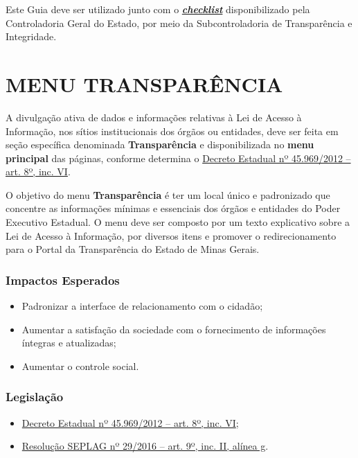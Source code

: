 \documentclass[]{book}
\providecommand{\tightlist}{%
  \setlength{\itemsep}{0pt}\setlength{\parskip}{0pt}}
\begin{document}
Este Guia deve ser utilizado junto com o \textbf{\emph{\href{https://forms.gle/x6rd1aGHzknH8y5m8}{checklist}}} disponibilizado pela Controladoria Geral do Estado, por meio da Subcontroladoria de Transparência e Integridade.

\hypertarget{menu-transparuxeancia}{%
\chapter{MENU TRANSPARÊNCIA}\label{menu-transparuxeancia}}

A divulgação ativa de dados e informações relativas à Lei de Acesso à Informação, nos sítios institucionais dos órgãos ou entidades, deve ser feita em seção específica denominada \textbf{Transparência} e disponibilizada no \textbf{menu principal} das páginas, conforme determina o \href{https://www.almg.gov.br/consulte/legislacao/completa/completa.html?tipo=DEC\&num=45969\&ano=2012}{Decreto Estadual nº 45.969/2012 -- art. 8º, inc. VI}.

O objetivo do menu \textbf{Transparência} é ter um local único e padronizado que concentre as informações mínimas e essenciais dos órgãos e entidades do Poder Executivo Estadual. O menu deve ser composto por um texto explicativo sobre a Lei de Acesso à Informação, por diversos itens e promover o redirecionamento para o Portal da Transparência do Estado de Minas Gerais.

\hypertarget{impactos-esperados}{%
\subsection{Impactos Esperados}\label{impactos-esperados}}

\begin{itemize}
\tightlist
\item
  Padronizar a interface de relacionamento com o cidadão;
\item
  Aumentar a satisfação da sociedade com o fornecimento de informações íntegras e atualizadas;
\item
  Aumentar o controle social.
\end{itemize}

\hypertarget{legislauxe7uxe3o}{%
\subsection{Legislação}\label{legislauxe7uxe3o}}

\begin{itemize}
\tightlist
\item
  \href{https://www.almg.gov.br/consulte/legislacao/completa/completa.html?tipo=DEC\&num=45969\&ano=2012}{Decreto Estadual nº 45.969/2012 -- art. 8º, inc. VI};
\item
  \href{http://www.planejamento.mg.gov.br/sites/default/files/documentos/resolucao_sitios_seplag_29_de_05_07_2016_1.pdf}{Resolução SEPLAG nº 29/2016 -- art. 9º, inc. II, alínea g}.
\end{itemize}
\end{document}
